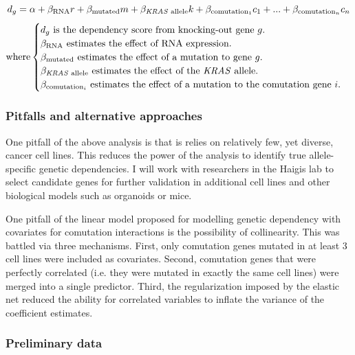 \begin{equation}
\label{eq:depmap-comut-equation}
d_g = \alpha + \beta_{\text{RNA}}r +\beta_{\text{mutated}}m + \beta_{\text{\emph{KRAS}{} allele}}k + \beta_{\text{comutation}_1}c_1 + ... + \beta_{\text{comutation}_n}c_n
\end{equation}
\begin{equation*}
    \text{where} 
    \begin{cases}
        d_g \text{ is the dependency score from knocking-out gene $g$.} \\
        \beta_{\text{RNA}} \text{ estimates the effect of RNA expression.} \\
        \beta_{\text{mutated}} \text{ estimates the effect of a mutation to gene $g$.} \\
        \beta_{\text{\emph{KRAS}{} allele}} \text{ estimates the effect of the \emph{KRAS}{} allele.} \\
        \beta_{\text{comutation}_i} \text{ estimates the effect of a mutation to the comutation gene $i$.}
    \end{cases}
\end{equation*}

\subsubsection*{Pitfalls and alternative approaches}

One pitfall of the above analysis is that is relies on relatively few, yet diverse, cancer cell lines.
This reduces the power of the analysis to identify true allele-specific genetic dependencies.
I will work with researchers in the Haigis lab to select candidate genes for further validation in additional cell lines and other biological models such as organoids or mice.

One pitfall of the linear model proposed for modelling genetic dependency with covariates for comutation interactions is the possibility of collinearity.
This was battled via three mechanisms.
First, only comutation genes mutated in at least 3 cell lines were included as covariates.
Second, comutation genes that were perfectly correlated (i.e. they were mutated in exactly the same cell lines) were merged into a single predictor.
Third, the regularization imposed by the elastic net reduced the ability for correlated variables to inflate the variance of the coefficient estimates.


\subsubsection*{Preliminary data}

